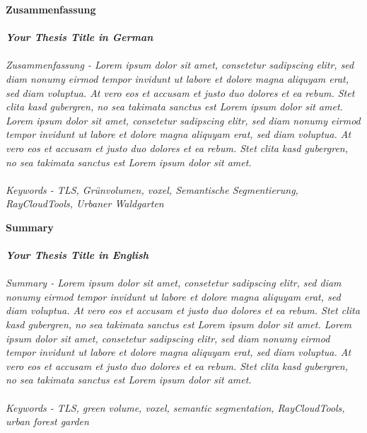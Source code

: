 \noindent
\textbf{Zusammenfassung} \\ %
\\
\textit{\textbf{Your Thesis Title in German}} \\ %
\\
\textit{\small Zusammenfassung - Lorem ipsum dolor sit amet, consetetur sadipscing elitr, sed diam nonumy eirmod tempor invidunt ut labore et dolore magna aliquyam erat, sed diam voluptua. At vero eos et accusam et justo duo dolores et ea rebum. Stet clita kasd gubergren, no sea takimata sanctus est Lorem ipsum dolor sit amet. Lorem ipsum dolor sit amet, consetetur sadipscing elitr, sed diam nonumy eirmod tempor invidunt ut labore et dolore magna aliquyam erat, sed diam voluptua. At vero eos et accusam et justo duo dolores et ea rebum. Stet clita kasd gubergren, no sea takimata sanctus est Lorem ipsum dolor sit amet.
} %
\\
\\
\textit{Keywords - TLS, Grünvolumen, voxel, Semantische Segmentierung, RayCloudTools, Urbaner Waldgarten} %

\vspace*{0.8cm}

\noindent
\textbf{Summary} \\ %
\\
\textit{\textbf{Your Thesis Title in English}} \\ %
\\
\textit{\small Summary - Lorem ipsum dolor sit amet, consetetur sadipscing elitr, sed diam nonumy eirmod tempor invidunt ut labore et dolore magna aliquyam erat, sed diam voluptua. At vero eos et accusam et justo duo dolores et ea rebum. Stet clita kasd gubergren, no sea takimata sanctus est Lorem ipsum dolor sit amet. Lorem ipsum dolor sit amet, consetetur sadipscing elitr, sed diam nonumy eirmod tempor invidunt ut labore et dolore magna aliquyam erat, sed diam voluptua. At vero eos et accusam et justo duo dolores et ea rebum. Stet clita kasd gubergren, no sea takimata sanctus est Lorem ipsum dolor sit amet. 
} %
\\
\\
\textit{Keywords - TLS, green volume, voxel, semantic segmentation, RayCloudTools, urban forest garden} %
